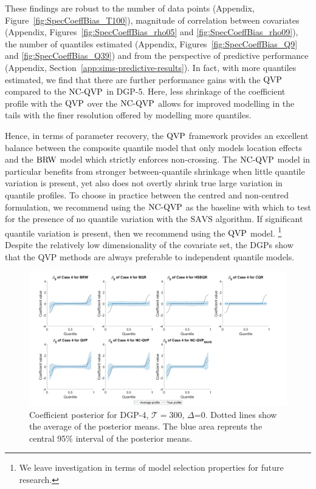 These findings are robust to the number of data points (Appendix, Figure~\ref{fig:SpecCoeffBias_T100}), magnitude of correlation between covariates (Appendix, Figures~\ref{fig:SpecCoeffBias_rho05} and \ref{fig:SpecCoeffBias_rho09}), the number of quantiles estimated (Appendix, Figures~\ref{fig:SpecCoeffBias_Q9} and \ref{fig:SpecCoeffBias_Q39}) and from the perspective of predictive performance (Appendix, Section~\ref{app:sims-predictive-results}). In fact, with more quantiles estimated, we find that there are further performance gains with the $\operatorname{QVP}$ compared to the $\operatorname{NC-QVP}$ in $\mathrm{DGP}$-5. Here, less shrinkage of the coefficient profile with the $\operatorname{QVP}$ over the $\operatorname{NC-QVP}$ allows for improved modelling in the tails with the finer resolution offered by modelling more quantiles.  
%

Hence, in terms of parameter recovery, the $\operatorname{QVP}$ framework provides an excellent balance between the composite quantile model that only models location effects and the $\operatorname{BRW}$ model which strictly enforces non-crossing. The $\operatorname{NC-QVP}$ model in particular benefits from stronger between-quantile shrinkage when little quantile variation is present, yet also does not overtly shrink true large variation in quantile profiles. To choose in practice between the centred and non-centred formulation, we recommend using the $\operatorname{NC-QVP}$ as the baseline with which to test for the presence of no quantile variation with the $\mathrm{SAVS}$ algorithm. If significant quantile variation is present, then we recommend using the $\operatorname{QVP}$ model.%
\footnote{We leave investigation in terms of model selection properties for future research.} Despite the relatively low dimensionality of the covariate set, the DGPs show that the QVP methods are always preferable to independent quantile models.
%
\begin{figure}
    \centering
    \includegraphics[width=\linewidth]{Figures/PresFig4_T=300.jpg}
    \caption{Coefficient posterior for $\mathrm{DGP}$-4, $\mathcal{T}=300$, $\varDelta$=0. Dotted lines show the average of the posterior means. The blue area reprents the central 95$\%$ interval of the posterior means.} %
    \label{fig:C4}
\end{figure}

